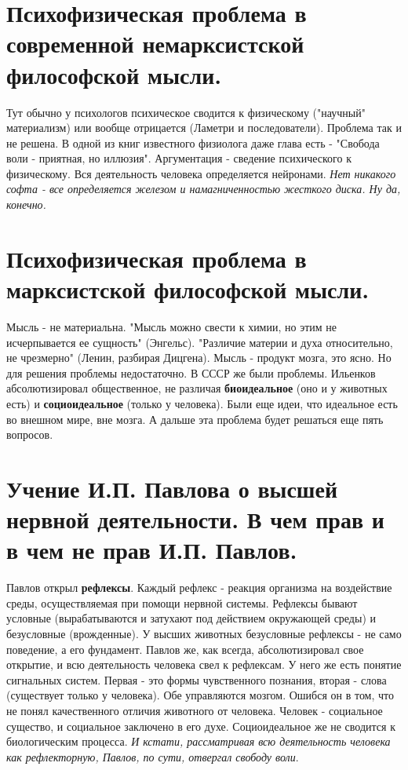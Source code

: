 \section{ Психофизическая проблема в современной немарксистской философской мысли.}
Тут обычно у психологов психическое сводится к физическому ("научный" материализм) или вообще отрицается (Ламетри и последователи). Проблема так и не решена. В одной из книг известного физиолога даже глава есть - "Свобода воли - приятная, но иллюзия". Аргументация - сведение психического к физическому. Вся деятельность человека определяется нейронами. \textit{Нет никакого софта - все определяется железом и намагниченностью жесткого диска. Ну да, конечно.}

\section{ Психофизическая проблема в марксистской философской мысли.}
Мысль - не материальна. "Мысль можно свести к химии, но этим не исчерпывается ее сущность" (Энгельс). "Различие материи и духа относительно, не чрезмерно" (Ленин, разбирая Дицгена). Мысль - продукт мозга, это ясно. Но для решения проблемы недостаточно. В СССР же были проблемы. Ильенков абсолютизировал общественное, не различая \textbf{биоидеальное} (оно и у животных есть) и \textbf{социоидеальное} (только у человека). Были еще идеи, что идеальное есть во внешном мире, вне мозга.
А дальше эта проблема будет решаться еще пять вопросов.

\section{ Учение И.П. Павлова о высшей нервной деятельности. В чем прав и в чем не прав И.П. Павлов.}
Павлов открыл \textbf{рефлексы}. Каждый рефлекс - реакция организма на воздействие среды, осуществляемая при помощи нервной системы. Рефлексы бывают условные (вырабатываются и затухают под действием окружающей среды) и безусловные (врожденные). У высших животных безусловные рефлексы - не само поведение, а его фундамент. Павлов же, как всегда, абсолютизировал свое открытие, и всю деятельность человека свел к рефлексам. У него же есть понятие сигнальных систем. Первая - это формы чувственного познания, вторая - слова (существует только у человека). Обе управляются мозгом. Ошибся он в том, что не понял качественного отличия животного от человека. Человек - социальное существо, и социальное заключено в его духе. Социоидеальное же не сводится к биологическим процесса. \textit{И кстати, рассматривая всю деятельность человека как рефлекторную, Павлов, по сути, отвергал свободу воли}.

